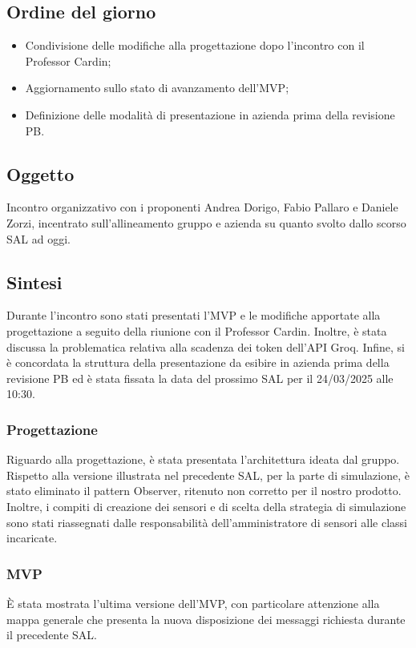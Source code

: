 \documentclass[10pt]{article}
\begin{document}
\subsection{Ordine del giorno}
\begin{itemize}
    \item Condivisione delle modifiche alla progettazione dopo l'incontro con il Professor Cardin;
    \item Aggiornamento sullo stato di avanzamento dell’MVP;
    \item Definizione delle modalità di presentazione in azienda prima della revisione PB.
\end{itemize}

\subsection{Oggetto}
Incontro organizzativo con i proponenti Andrea Dorigo, Fabio Pallaro e Daniele Zorzi, incentrato sull'allineamento gruppo e azienda su quanto svolto dallo scorso SAL ad oggi.

\subsection{Sintesi}
Durante l'incontro sono stati presentati l’MVP e le modifiche apportate alla progettazione a seguito della riunione con il Professor Cardin. Inoltre, è stata discussa la problematica relativa alla scadenza dei token dell’API Groq. Infine, si è concordata la struttura della presentazione da esibire in azienda prima della revisione PB ed è stata fissata la data del prossimo SAL per il 24/03/2025 alle 10:30.

    \subsubsection{Progettazione}
    Riguardo alla progettazione, è stata presentata l'architettura ideata dal gruppo. Rispetto alla versione illustrata nel precedente SAL, per la parte di simulazione, è stato eliminato il pattern Observer, ritenuto non corretto per il nostro prodotto. Inoltre, i compiti di creazione dei sensori e di scelta della strategia di simulazione sono stati riassegnati dalle responsabilità dell'amministratore di sensori alle classi incaricate.
    
    \subsubsection{MVP}
    È stata mostrata l'ultima versione dell’MVP, con particolare attenzione alla mappa generale che presenta la nuova disposizione dei messaggi richiesta durante il precedente SAL.
\end{document}
